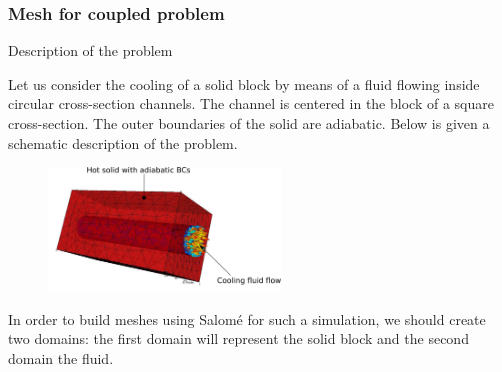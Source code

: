 \documentclass[10pt, hyperref={unicode=true,pdfusetitle, bookmarks=true,bookmarksnumbered=false,bookmarksopen=false, breaklinks=false,pdfborder={0 0 1},backref=true,colorlinks=true,linkcolor=darkblue,pageanchor}]{beamer}
\begin{document}
\begin{frame}
\frametitle{Mesh for coupled problem}
\begin{block}{Description of the problem}

Let us consider the cooling of a solid block by means of a fluid flowing inside circular cross-section channels. The channel is centered in the block of a square cross-section. The outer boundaries of the solid are adiabatic. Below is given a schematic description of the problem.
%
\begin{figure}
\includegraphics[width=0.55\textwidth]{PICTURES/Pb_couple.pdf}
\end{figure}
\vspace{-0.5cm}
In order to build meshes using Salom\'e for such a simulation, we should create two domains: the first domain will represent the solid block and the second domain the fluid.

\end{block}

\end{frame}
\end{document}
